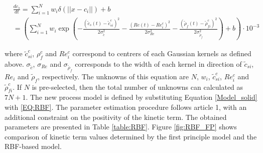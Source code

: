 \documentclass[../Article_Model_Parameters.tex]{subfiles}
\begin{document}
	{\footnotesize
		\begin{equation}
			\begin{split} \label{EQ:RBF}
				&\frac{dc_s}{dt} = \sum_{i=1}^{N} w_i \delta(||x-c_i||) + b \\
				&= \left( \sum_{i=1}^{N} w_i \exp \left( - \frac{ \left( \tilde{c}_s(t)-\tilde{c}_{si}^c \right)^2 }{2\sigma_{\tilde{c}}^2} - \frac{ \left( Re(t)-Re_i^c \right)^2 }{2\sigma_{Re}^2} - \frac{ \left( \tilde{\rho}_f(t) - \tilde{\rho}_{fi}^c \right)^2 }{2\sigma_{\tilde{\rho}_f}^2} \right) + b \right) \cdot 10^{-3}
			\end{split}
		\end{equation}
	}
	
	where $\tilde{c}_{si}^c$, $\rho_f^c$ and $Re_i^c$ correspond to centrers of each Gaussian kernels as defined above. $\sigma_{\tilde{c}}$, $\sigma_{Re}$ and $\sigma_{\tilde{\rho}_f}$ corresponds to the width of each kernel in direction of $\tilde{c}_{si}$, $Re_i$ and $\tilde{\rho}_f$, respectively. The unknowns of this equation are $N$, $w_i$, $\tilde{c}_{si}^c$, $Re_i^c$ and $\tilde{\rho}_{fi}^c$. If $N$ is pre-selected, then the total number of unknowns can calculated as $7N+1$. The new process model is defined by substituting Equation \ref{Model_solid} with \ref{EQ:RBF}. The parameter estimation procedure follows {\color{red}article 1}, with an additional constraint on the positivity of the kinetic term. The obtained parameters are presented in Table \ref{table:RBF}. Figure \ref{fig:RBF_FP} shows comparison of kinetic term values determined by the first principle model and the RBF-based model.
	
	\begin{table}[H]
		\centering
		\caption{Parameters of the RBF network}
		\label{table:RBF}
	\end{table}
	
\end{document}
